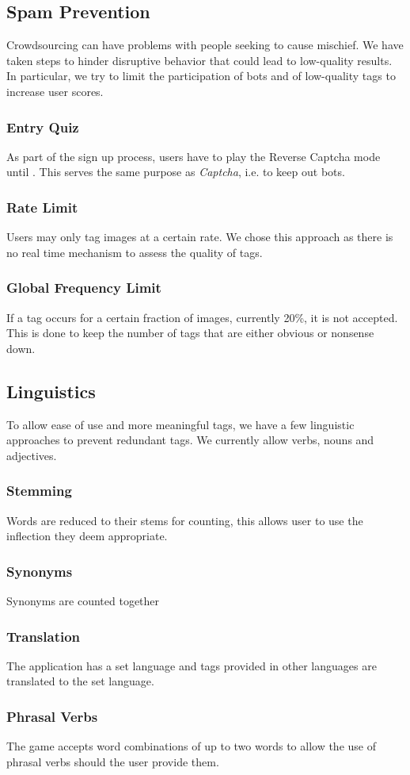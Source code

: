 \subsection{Spam Prevention}

Crowdsourcing can have problems with people seeking to cause mischief. We have taken steps to hinder disruptive behavior that could lead to low-quality results. In particular, we try to limit the participation of bots and  of low-quality tags to increase user scores.


\subsubsection{Entry Quiz}

As part of the sign up process, users have to play the Reverse Captcha mode until . This serves the same purpose as \textit{Captcha}, i.e. to keep out bots.


\subsubsection{Rate Limit}
Users may only tag images at a certain rate. We chose this approach as there is no real time mechanism to assess the quality of tags.

\subsubsection{Global Frequency Limit}
If a tag occurs for a certain fraction of images, currently 20\%, it is not accepted. This is done to keep the number of tags that are either obvious or nonsense down.




\subsection{Linguistics}

To allow ease of use and more meaningful tags, we have a few linguistic approaches to prevent redundant tags. We currently allow verbs, nouns and adjectives.



\subsubsection{Stemming}
Words are reduced to their stems for counting, this allows user to use the inflection they deem appropriate.


\subsubsection{Synonyms}
Synonyms are counted together


\subsubsection{Translation}
The application has a set language and tags provided in other languages are translated to the set language.


\subsubsection{Phrasal Verbs}
The game accepts word combinations of up to two words to allow the use of phrasal verbs should the user provide them.



